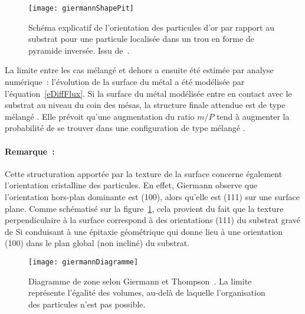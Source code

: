 \begin{figure}[!htb]
	\centering
	\texttt{[image: giermannShapePit]}
	\caption{Schéma explicatif de l'orientation des particules d'or par rapport au substrat pour une particule localisée dans un trou en forme de pyramide inversée. Issu de~\cite{giermann2011requirements}.}
	\label{giermannShapePit}
\end{figure} 
La limite entre les cas \og mélangé \fg{} et \og dehors \fg{} a ensuite été estimée par analyse numérique~: l'évolution de la surface du métal a été modélisée par l'équation~\ref{eDiffFlux}. Si la surface du métal modélisée entre en contact avec le substrat au niveau du coin des mésas, la structure finale attendue est de type \og mélangé \fg. Elle prévoit qu'une augmentation du ratio $m/P$ tend à augmenter la probabilité de se trouver dans une configuration de type \og mélangé \fg.\par 

\paragraph*{Remarque~:} Cette structuration apportée par la texture de la surface concerne également l'orientation cristalline des particules. En effet, Giermann observe que l'orientation hors-plan dominante est (100), alors qu'elle est (111) sur une surface plane. Comme schématisé sur la figure~\ref{giermannShapePit}, cela provient du fait que la texture perpendiculaire à la surface correspond à des orientations (111) du substrat gravé de Si conduisant à une \og épitaxie géométrique\fg{} qui donne lieu à une orientation (100) dans le plan global (non incliné) du substrat.\par 
\begin{figure}[!htb]
	\centering
	\texttt{[image: giermannDiagramme]}
	\caption{Diagramme de zone selon Giermann et Thompson~\cite{giermann2011requirements}. La limite représente l'égalité des volumes, au-delà de laquelle l'organisation des particules n'est pas possible.}
	\label{giermannDiagramme}
\end{figure} 
